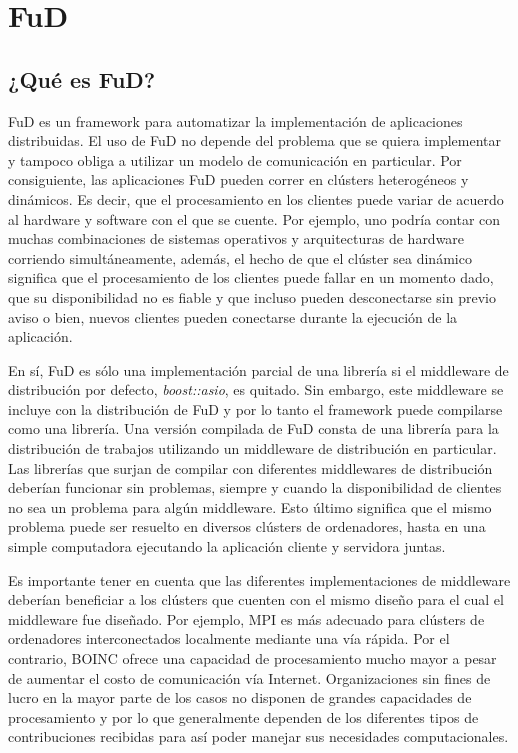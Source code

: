 \section{FuD}
\label{seccion:fud}

\subsection{¿Qué es FuD?}

FuD es un framework para automatizar la implementación de aplicaciones distribuidas. El uso de FuD no depende del problema que se quiera implementar y tampoco 
obliga a utilizar un modelo de comunicación en particular. Por consiguiente, las aplicaciones FuD pueden correr en clústers heterogéneos y dinámicos. 
Es decir, que el procesamiento en los clientes puede variar de acuerdo al hardware y software con el que se cuente. Por ejemplo, uno podría contar con muchas 
combinaciones de sistemas operativos y arquitecturas de hardware corriendo simultáneamente, además, el hecho de que el clúster sea dinámico significa que el procesamiento
 de los clientes puede fallar en un momento dado, que su disponibilidad no es fiable y que incluso pueden desconectarse sin previo aviso o bien, nuevos clientes pueden
 conectarse durante la ejecución de la aplicación.

En sí, FuD es sólo una implementación parcial de una librería si el middleware de distribución por defecto, \textit{boost::asio}, es quitado. Sin embargo, este middleware se
 incluye con la distribución de FuD y por lo tanto el framework puede compilarse como una librería. Una versión compilada de FuD consta de una librería para la distribución de
 trabajos utilizando un middleware de distribución en particular. Las librerías que surjan de compilar con diferentes middlewares de distribución deberían funcionar sin problemas,
 siempre y cuando la disponibilidad de clientes no sea un problema para algún middleware. Esto último significa que el mismo problema puede ser resuelto en diversos clústers de ordenadores, hasta en una simple computadora ejecutando la aplicación cliente y servidora juntas.

Es importante tener en cuenta que las diferentes implementaciones de middleware deberían beneficiar a los clústers que cuenten con el mismo diseño 
para el cual el middleware fue diseñado. Por ejemplo, MPI es más adecuado para clústers de ordenadores interconectados localmente mediante una vía rápida.
 Por el contrario, BOINC ofrece una capacidad de procesamiento mucho mayor a pesar de aumentar el costo de comunicación vía Internet.
Organizaciones sin fines de lucro en la mayor parte de los casos no disponen de grandes capacidades de procesamiento y por lo que generalmente dependen de
 los diferentes tipos de contribuciones recibidas para así poder manejar sus necesidades computacionales.


